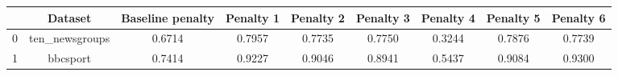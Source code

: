 \begin{tabular}{|l|c|c|c|c|c|c|c|c|}
\hline
 & Dataset & Baseline penalty & Penalty 1 & Penalty 2 & Penalty 3 & Penalty 4 & Penalty 5 & Penalty 6 \\
\hline
0 & ten_newsgroups & 0.6714 & 0.7957 & 0.7735 & 0.7750 & 0.3244 & 0.7876 & 0.7739 \\
1 & bbcsport & 0.7414 & 0.9227 & 0.9046 & 0.8941 & 0.5437 & 0.9084 & 0.9300 \\
\hline
\end{tabular}
